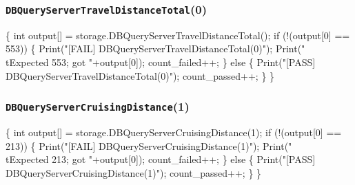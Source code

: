 \documentclass{article}
\def\nwendcode{\endtrivlist \endgroup}
\let\nwdocspar=\par
\begin{document}
\subsubsection{{\tt{}DBQueryServerTravelDistanceTotal}(0)}
\nwenddocs{}\endmoddef{}
\{
  int output[] = storage.DBQueryServerTravelDistanceTotal();
  if (!(output[0] == 553)) \{
    Print("[FAIL] DBQueryServerTravelDistanceTotal(0)");
    Print("\\tExpected 553; got "+output[0]);
    count_failed++;
  \} else \{
    Print("[PASS] DBQueryServerTravelDistanceTotal(0)");
    count_passed++;
  \}
\}
\nwendcode{}\nwdocspar
\subsubsection{{\tt{}DBQueryServerCruisingDistance}(1)}
\nwenddocs{}\endmoddef{}
\{
  int output[] = storage.DBQueryServerCruisingDistance(1);
  if (!(output[0] == 213)) \{
    Print("[FAIL] DBQueryServerCruisingDistance(1)");
    Print("\\tExpected 213; got "+output[0]);
    count_failed++;
  \} else \{
    Print("[PASS] DBQueryServerCruisingDistance(1)");
    count_passed++;
  \}
\}
\nwendcode{}\nwdocspar
\end{document}
